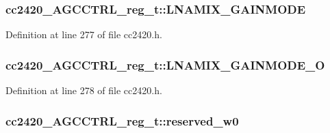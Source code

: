 \subsubsection[{\texorpdfstring{L\+N\+A\+M\+I\+X\+\_\+\+G\+A\+I\+N\+M\+O\+DE}{LNAMIX_GAINMODE}}]{ cc2420\+\_\+\+A\+G\+C\+C\+T\+R\+L\+\_\+reg\+\_\+t\+::\+L\+N\+A\+M\+I\+X\+\_\+\+G\+A\+I\+N\+M\+O\+DE}\hypertarget{structcc2420___a_g_c_c_t_r_l__reg__t_a1478d5b1efcbc6ffc9af5822f767c5e2}{}\label{structcc2420___a_g_c_c_t_r_l__reg__t_a1478d5b1efcbc6ffc9af5822f767c5e2}


Definition at line 277 of file cc2420.\+h.

\subsubsection[{\texorpdfstring{L\+N\+A\+M\+I\+X\+\_\+\+G\+A\+I\+N\+M\+O\+D\+E\+\_\+O}{LNAMIX_GAINMODE_O}}]{ cc2420\+\_\+\+A\+G\+C\+C\+T\+R\+L\+\_\+reg\+\_\+t\+::\+L\+N\+A\+M\+I\+X\+\_\+\+G\+A\+I\+N\+M\+O\+D\+E\+\_\+O}\hypertarget{structcc2420___a_g_c_c_t_r_l__reg__t_a6956a8cd27aa2c8a90707c071391a3ff}{}\label{structcc2420___a_g_c_c_t_r_l__reg__t_a6956a8cd27aa2c8a90707c071391a3ff}


Definition at line 278 of file cc2420.\+h.

\subsubsection[{\texorpdfstring{reserved\+\_\+w0}{reserved_w0}}]{ cc2420\+\_\+\+A\+G\+C\+C\+T\+R\+L\+\_\+reg\+\_\+t\+::reserved\+\_\+w0}\hypertarget{structcc2420___a_g_c_c_t_r_l__reg__t_a6e3c5c5fa089d68b0acba0d66407816f}{}\label{structcc2420___a_g_c_c_t_r_l__reg__t_a6e3c5c5fa089d68b0acba0d66407816f}


